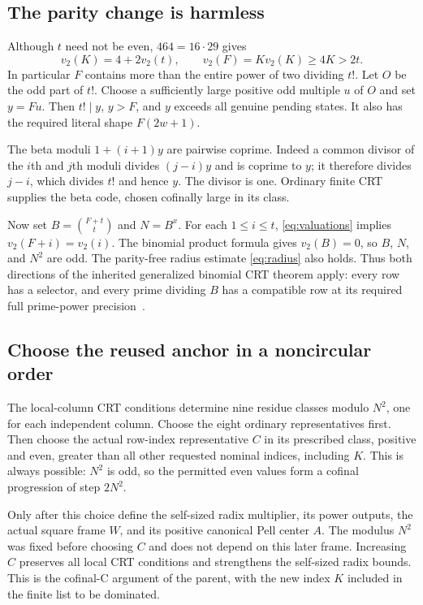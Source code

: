 \documentclass[11pt,a4paper]{article}
\theoremstyle{definition}
\begin{document}
\subsection{The parity change is harmless}

Although $t$ need not be even, $464=16\cdot29$ gives
\begin{equation}\label{eq:valuations}
 v_2(K)=4+2v_2(t),\qquad
 v_2(F)=K v_2(K)\ge4K>2t.
\end{equation}
In particular $F$ contains more than the entire power of two dividing
$t!$. Let $O$ be the odd part of $t!$. Choose a sufficiently large
positive odd multiple $u$ of $O$ and set $y=Fu$. Then $t!\mid y$,
$y>F$, and $y$ exceeds all genuine pending states. It also has the
required literal shape $F(2w+1)$.

The beta moduli $1+(i+1)y$ are pairwise coprime. Indeed a common divisor
of the $i$th and $j$th moduli divides $(j-i)y$ and is coprime to $y$;
it therefore divides $j-i$, which divides $t!$ and hence $y$. The
divisor is one. Ordinary finite CRT supplies the beta code, chosen
cofinally large in its class.

Now set $B=\binom{F+t}{t}$ and $N=B^x$. For each $1\le i\le t$,
\eqref{eq:valuations} implies $v_2(F+i)=v_2(i)$. The binomial product
formula gives $v_2(B)=0$, so $B$, $N$, and $N^2$ are odd. The
parity-free radius estimate \eqref{eq:radius} also holds. Thus both
directions of the inherited generalized binomial CRT theorem apply:
every row has a selector, and every prime dividing $B$ has a compatible
row at its required full prime-power precision~\cite{binomial151}.

\subsection{Choose the reused anchor in a noncircular order}

The local-column CRT conditions determine nine residue classes modulo
$N^2$, one for each independent column. Choose the eight ordinary
representatives first. Then choose the actual row-index representative
$C$ in its prescribed class, positive and even, greater than all other
requested nominal indices, including $K$. This is always possible:
$N^2$ is odd, so the permitted even values form a cofinal progression
of step $2N^2$.

Only after this choice define the self-sized radix multiplier, its power
outputs, the actual square frame $W$, and its positive canonical Pell
center $A$. The modulus $N^2$ was fixed before choosing $C$ and does not
depend on this later frame. Increasing $C$ preserves all local CRT
conditions and strengthens the self-sized radix bounds. This is the
cofinal-C argument of the parent, with the new index $K$ included in the
finite list to be dominated.
\end{document}
